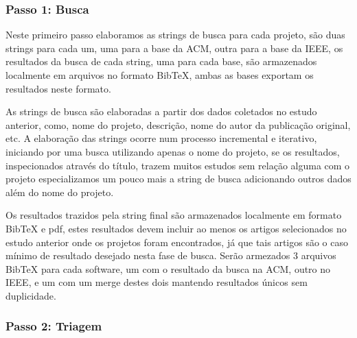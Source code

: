 \subsubsection{Passo 1: Busca}


Neste primeiro passo elaboramos as strings de busca para cada projeto, são duas
strings para cada um, uma para a base da ACM, outra para a base da IEEE, os
resultados da busca de cada string, uma para cada base, são armazenados
localmente em arquivos no formato BibTeX, ambas as bases exportam os resultados
neste formato.

As strings de busca são elaboradas a partir dos dados coletados no estudo
anterior, como, nome do projeto, descrição, nome do autor da publicação
original, etc. A elaboração das strings ocorre num processo incremental e
iterativo, iniciando por uma busca utilizando apenas o nome do projeto, se os
resultados, inspecionados através do título, trazem muitos estudos sem relação
alguma com o projeto especializamos um pouco mais a string de busca adicionando
outros dados além do nome do projeto.


Os resultados trazidos pela string final são armazenados localmente em formato
BibTeX e pdf, estes resultados devem incluir ao menos os artigos selecionados
no estudo anterior onde os projetos foram encontrados, já que tais artigos são
o caso mínimo de resultado desejado nesta fase de busca. Serão armezados 3
arquivos BibTeX para cada software, um com o resultado da busca na ACM, outro
no IEEE, e um com um merge destes dois mantendo resultados únicos sem
duplicidade.


\subsubsection{Passo 2: Triagem}

